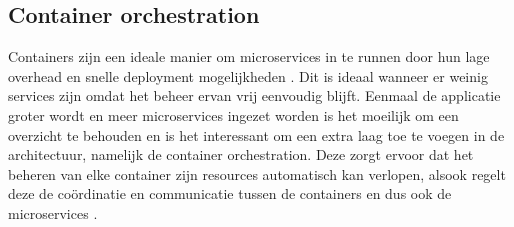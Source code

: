 \subsection{Container orchestration}
Containers zijn een ideale manier om microservices in te runnen door hun lage overhead en snelle deployment mogelijkheden \autocite{Jawarneh2019}. Dit is ideaal wanneer er weinig services zijn omdat het beheer ervan vrij eenvoudig blijft. Eenmaal de applicatie groter wordt en meer microservices ingezet worden is het moeilijk om een overzicht te behouden en is het interessant om een extra laag toe te voegen in de architectuur, namelijk de container orchestration. Deze zorgt ervoor dat het beheren van elke container zijn resources automatisch kan verlopen, alsook regelt deze de coördinatie en communicatie tussen de containers en dus ook de microservices \autocite{Liu2020}. 
%
%
%
%


